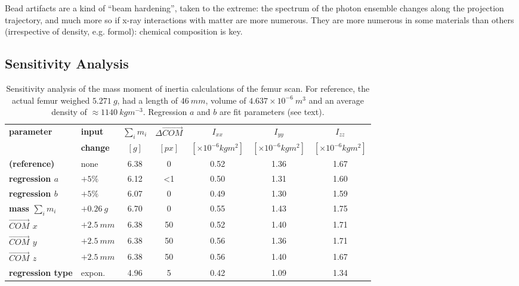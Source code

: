 Bead artifacts are a kind of ``beam hardening'', taken to the extreme: the spectrum of the photon ensemble changes along the projection trajectory, and much more so if x-ray interactions with matter are more numerous.
They are more numerous in some materials than others (irrespective of density, e.g. formol): chemical composition is key.


\subsection{Sensitivity Analysis}
\label{sec:org3d70516}

\begin{table}[p]
\caption{\label{tab:sensitivity}Sensitivity analysis of the mass moment of inertia calculations of the femur scan. For reference, the actual femur weighed \(5.271\ g\), had a length of \(46\ mm\), volume of \(4.637\times 10^{-6}\ m^{3}\) and an average density of \(\approx 1140\ kg m^{-3}\). Regression \(a\) and \(b\) are fit parameters (see text).}
\centering
\begin{tabular}{|l|l|c|c|c|c|c|}
\hline
\textbf{parameter} & \textbf{input} & \textbf{\(\sum_{i}m_{i}\)} & \textbf{\(\Delta \vec{COM}\)} & \textbf{\(I_{xx}\)} & \textbf{\(I_{yy}\)} & \textbf{\(I_{zz}\)}\\[0pt]
 & \textbf{change} & \([g]\) & \([px]\) & \([\times 10^{-6} kg m^2]\) & \([\times 10^{-6} kg m^2]\) & \([\times 10^{-6} kg m^2]\)\\[0pt]
\hline
\hline
\textbf{(reference)} & none & 6.38 & 0 & 0.52 & 1.36 & 1.67\\[0pt]
\hline
\textbf{regression \(a\)} & \(+5 \%\) & 6.12 & <1 & 0.50 & 1.31 & 1.60\\[0pt]
\textbf{regression \(b\)} & \(+5 \%\) & 6.07 & 0 & 0.49 & 1.30 & 1.59\\[0pt]
\hline
\textbf{mass \(\sum_{i} m_{i}\)} & \(+0.26\ g\) & 6.70 & 0 & 0.55 & 1.43 & 1.75\\[0pt]
\hline
\textbf{\(\vec{COM}\) \(x\)} & \(+2.5\ mm\) & 6.38 & 50 & 0.52 & 1.40 & 1.71\\[0pt]
\textbf{\(\vec{COM}\) \(y\)} & \(+2.5\ mm\) & 6.38 & 50 & 0.56 & 1.36 & 1.71\\[0pt]
\textbf{\(\vec{COM}\) \(z\)} & \(+2.5\ mm\) & 6.38 & 50 & 0.56 & 1.40 & 1.67\\[0pt]
\hline
\textbf{regression type} & expon. & 4.96 & 5 & 0.42 & 1.09 & 1.34\\[0pt]
\hline
\hline
\end{tabular}
\end{table}


